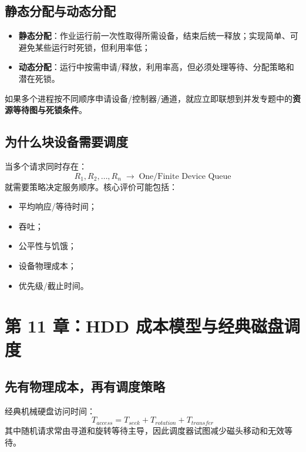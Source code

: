 \documentclass[11pt,a4paper]{ctexart}
\newcommand{\kw}[1]{\textbf{#1}}
\newcommand{\arr}{\;\longrightarrow\;}
\begin{document}
\subsection{静态分配与动态分配}
\begin{itemize}
  \item \kw{静态分配}：作业运行前一次性取得所需设备，结束后统一释放；实现简单、可避免某些运行时死锁，但利用率低；
  \item \kw{动态分配}：运行中按需申请/释放，利用率高，但必须处理等待、分配策略和潜在死锁。
\end{itemize}
如果多个进程按不同顺序申请设备/控制器/通道，就应立即联想到并发专题中的\kw{资源等待图与死锁条件}。

\subsection{为什么块设备需要调度}
当多个请求同时存在：
\[
R_1,R_2,\ldots,R_n\arr\boxed{\text{One/Finite Device Queue}}
\]
就需要策略决定服务顺序。核心评价可能包括：
\begin{itemize}
  \item 平均响应/等待时间；
  \item 吞吐；
  \item 公平性与饥饿；
  \item 设备物理成本；
  \item 优先级/截止时间。
\end{itemize}

\section{第 11 章：HDD 成本模型与经典磁盘调度}

\subsection{先有物理成本，再有调度策略}
经典机械硬盘访问时间：
\[
\boxed{T_{access}=T_{seek}+T_{rotation}+T_{transfer}}
\]
其中随机请求常由寻道和旋转等待主导，因此调度器试图减少磁头移动和无效等待。
\end{document}
